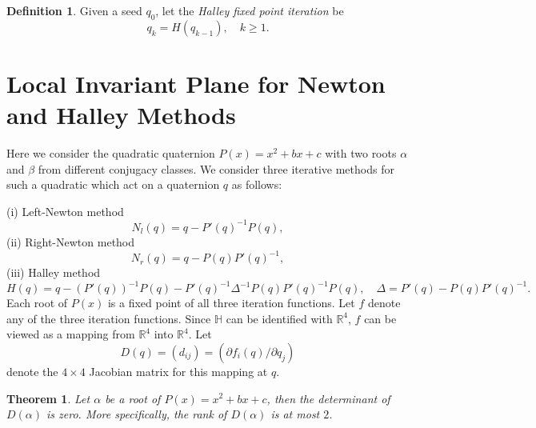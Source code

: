 \documentclass{article}
\newtheorem{thm}{Theorem}
\theoremstyle{definition}
\newtheorem{definition}{Definition}
\begin{document}
\begin{definition}
Given a seed $q_0$, let the {\it Halley fixed point iteration} be
\begin{equation}
q_{k}=H(q_{k-1}), \quad k \geq 1.
\end{equation}
\end{definition}


\section{Local Invariant Plane for Newton and Halley Methods}
\label{LIPlane}
Here we consider the quadratic quaternion $P(x)=x^2+bx+c$ with two roots $\alpha$ and $\beta$ from different conjugacy classes.  We consider three iterative methods for such a quadratic which act on a quaternion $q$ as follows:

\noindent (i) Left-Newton method
\begin{equation}
 N_l(q)=q- P'(q)^{-1} P(q),
\end{equation}
(ii) Right-Newton method
\begin{equation}
N_r(q)=q- P(q)P'(q)^{-1},
\end{equation}
(iii) Halley method
\begin{equation}
H(q)=q- (P'(q))^{-1} P(q) - P'(q)^{-1} \Delta^{-1}P(q) P'(q)^{-1}P(q),
\quad \Delta= P'(q)-P(q) P'(q)^{-1}.
\end{equation}
Each root of $P(x)$ is  a fixed point of all three iteration functions. Let $f$ denote any of the three iteration functions. Since
$\mathbb{H}$ can be identified with $\mathbb{R}^4$,
$f$ can be viewed as a mapping from $\mathbb{R}^4$ into $\mathbb{R}^4$. Let
\begin{equation}
D(q)= (d_{ij})= (\partial f_i(q)/ \partial q_j)
\end{equation}
denote the $4 \times 4$ Jacobian matrix for this mapping at $q$.

\begin{thm} \label{inv} Let $\alpha$ be a root of $P(x)=x^2+bx+c$, then the determinant of $D(\alpha)$ is zero. More specifically, the rank of $D(\alpha)$ is at most $2$.
\end{thm}
\end{document}
